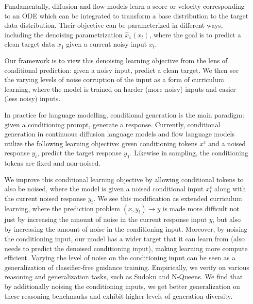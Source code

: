 \documentclass{article}
\begin{document}
Fundamentally, diffusion and flow models learn a score or velocity corresponding to an ODE
which can be integrated to transform a base distribution to the target data distribution.
Their objective can be parameterized in different ways,
including the denoising parametrization $\hat{x}_1(x_t)$, where the goal is to predict a
clean target data $x_1$ given a current noisy input $x_t$.

Our framework is to view this denoising learning objective from the lens of conditional prediction:
given a noisy input, predict a clean target. We then see the varying levels of noise
corruption of the input as a form of curriculum learning, where the model is trained on
harder (more noisy) inputs and easier (less noisy) inputs.

In practice for language modelling, conditional generation is the main paradigm: given a
conditioning prompt, generate a response. Currently, conditional generation in continuous
diffusion language models and flow language models utilize the following learning objective: given
conditioning tokens $x^c$ and a noised response $y_t$, predict the target response $y_1$.
Likewise in sampling, the conditioning tokens are fixed and non-noised. 

We improve this conditional learning objective
by allowing conditional tokens to also be noised, where the model is given
a noised conditional input $x_t^c$ along with the current noised response $y_t$. We see this modification
as extended curriculum learning, where the prediction problem $(x, y_t) \to y$ is made more difficult not
just by increasing the amount of noise in the current response input $y_t$ but also by
increasing the amount of noise in the conditioning input. Moreover, by noising the conditioning input,
our model has a wider target that it can learn from
(also needs to predict the denoised conditioning input), making learning more compute
efficient. Varying the level of noise
on the conditioning input can be seen as a generalization of classifier-free guidance training.
Empirically, we verify on various reasoning and generalization tasks, such as Sudoku and N-Queens. We find that
by additionally noising the conditioning inputs, we get better generalization on these reasoning benchmarks
and exhibit higher levels of generation diversity.
\end{document}
